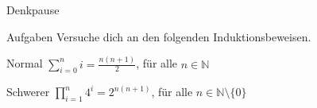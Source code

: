 {
\begin{frame}[fragile]{Denkpause}
    \begin{alertblock}{Aufgaben}
    Versuche dich an den folgenden Induktionsbeweisen.
    \end{alertblock}
    
    \begin{block}{Normal}
        $\displaystyle\sum_{i=0}^{n} i = \frac{n(n+1)}{2}$, für alle $n \in \mathbb{N}$
    \end{block}
    \begin{block}{Schwerer}
        $\displaystyle\prod_{i=1}^{n} 4^i = 2^{n(n+1)}$, für alle $n \in \mathbb{N}\setminus \{0\}$
    \end{block}
\end{frame}
}

